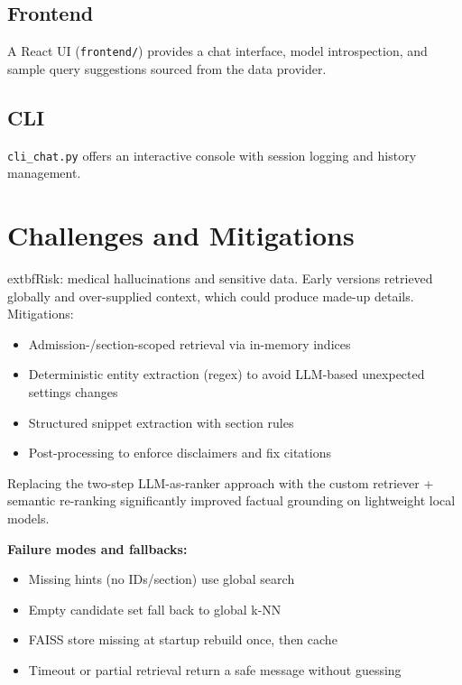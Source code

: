 \subsection{Frontend}
A React UI (\texttt{frontend/}) provides a chat interface, model introspection, and sample query suggestions sourced from the data provider.

\subsection{CLI}
\texttt{cli\_chat.py} offers an interactive console with session logging and history management.

\section{Challenges and Mitigations}
	extbf{Risk: medical hallucinations and sensitive data.} Early versions retrieved globally and over-supplied context, which could produce made-up details. Mitigations:
\begin{itemize}
  \item Admission-/section-scoped retrieval via in-memory indices
  \item Deterministic entity extraction (regex) to avoid LLM-based unexpected settings changes
  \item Structured snippet extraction with section rules
  \item Post-processing to enforce disclaimers and fix citations
\end{itemize}

\noindent Replacing the two-step LLM-as-ranker approach with the custom retriever + semantic re-ranking significantly improved factual grounding on lightweight local models.

\noindent \textbf{Failure modes and fallbacks:}
\begin{itemize}
  \item Missing hints (no IDs/section) \textrightarrow{} use global search
  \item Empty candidate set \textrightarrow{} fall back to global k-NN
  \item FAISS store missing at startup \textrightarrow{} rebuild once, then cache
  \item Timeout or partial retrieval \textrightarrow{} return a safe message without guessing
\end{itemize}


